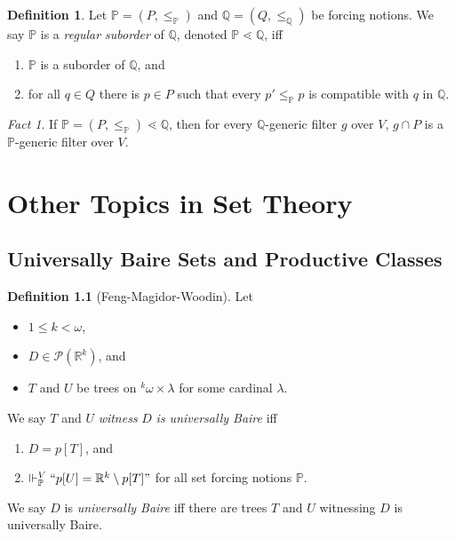 \documentclass[12pt, twoside]{memoir}
\numberwithin{equation}{section}
\theoremstyle{definition}
\newtheorem{defi}[thm]{Definition}
\theoremstyle{remark}
\newtheorem{fact}[thm]{Fact}
\theoremstyle{definition}
\theoremstyle{definition}
\theoremstyle{definition}
\theoremstyle{remark}
\begin{document}
\begin{defi}
Let $\mathbb{P} = (P, \leq_{\mathbb{P}})$ and $\mathbb{Q} = (Q, \leq_{\mathbb{Q}})$ be forcing notions. We say $\mathbb{P}$ is a \emph{regular suborder} of $\mathbb{Q}$, denoted $\mathbb{P} \lessdot \mathbb{Q}$, iff 
\begin{enumerate}[label=(\alph*)]
    \item $\mathbb{P}$ is a suborder of $\mathbb{Q}$, and
    \item for all $q \in Q$ there is $p \in P$ such that every $p' \leq_{\mathbb{P}} p$ is compatible with $q$ in $\mathbb{Q}$.
\end{enumerate}
\end{defi}

\begin{fact}\label{regsubo}
If $\mathbb{P} = (P, \leq_{\mathbb{P}}) \lessdot \mathbb{Q}$, then for every $\mathbb{Q}$-generic filter $g$ over $V$, $g \cap P$ is a $\mathbb{P}$-generic filter over $V$.
\end{fact}

\chapter{Other Topics in Set Theory}\label{chap4}

\section{Universally Baire Sets and Productive Classes}\label{ss25}

\begin{defi}[Feng-Magidor-Woodin]
Let 
\begin{itemize}
    \item $1 \leq k < \omega$, 
    \item $D \in \mathcal{P}(\mathbb{R}^k)$, and
    \item $T$ and $U$ be trees on ${^{k}{\omega}} \times \lambda$ for some cardinal $\lambda$.
\end{itemize} 
We say $T$ and $U$ \emph{witness} $D$ \emph{is universally Baire} iff 
\begin{enumerate}[label=(\alph*)]
    \item $D = p[T]$, and
    \item $\Vdash^V_{\mathbb{P}} ``p[U] = \mathbb{R}^k \setminus p[T]"$ for all set forcing notions $\mathbb{P}$.
\end{enumerate}
We say $D$ is \emph{universally Baire} iff there are trees $T$ and $U$ witnessing $D$ is universally Baire.
\end{defi}
\end{document}
